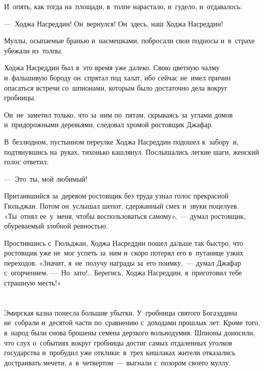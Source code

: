 \documentclass[12pt,a4paper]{book}
\begin{document}
И~опять, как тогда на~площади, в~толпе нарастало, и~гудело, и~отдавалось:

—~Ходжа Насреддин! Он~вернулся! Он~здесь, наш Ходжа Насреддин!

Муллы, осыпаемые бранью и~насмешками, побросали свои подносы и~в~страхе убежали из~толпы.

Ходжа Насреддин был в~это время уже далеко. Свою цветную чалму и~фальшивую бороду он~спрятал под халат, ибо сейчас не~имел причин опасаться встречи со~шпионами, которым было достаточно дела вокруг гробницы.

Он~не~заметил только, что за~ним по~пятам, скрываясь за~углами домов и~придорожными деревьями, следовал хромой ростовщик Джафар.

В~безлюдном, пустынном переулке Ходжа Насреддин подошел к~забору~и, подтянувшись на~руках, тихонько кашлянул. Послышались легкие шаги, женский голос ответил:

—~Это~ты, мой любимый!

Притаившийся за~деревом ростовщик без труда узнал голос прекрасной Гюльджан. Потом он~услышал шепот, сдержанный смех и~звуки поцелуев. «Ты~отнял ее~у~меня, чтобы воспользоваться самому»,~— думал ростовщик, обуреваемый злобной ревностью.

Простившись с~Гюльджан, Ходжа Насреддин пошел дальше так быстро, что ростовщик уже не~мог успеть за~ним и~скоро потерял его в~путанице узких переходов. «Значит, я~не~получу награды за~его поимку,~— думал Джафар с~огорчением. —~Но~зато!.. Берегись, Ходжа Насреддин, я~приготовил тебе страшную месть!»


\chapter{}

Эмирская казна понесла большие убытки. У~гробницы святого Богаэддина не~собрали и~десятой части по~сравнению с~доходами прошлых лет. Кроме того, в~народ были снова брошены семена дерзкого вольнодумия. Шпионы доносили, что слух о~событиях вокруг гробницы достиг самых отдаленных уголков государства и~пробудил уже отклики: в~трех кишлаках жители отказались достраивать мечети, а~в~четвертом~— выгнали с~позором своего муллу.
\end{document}
